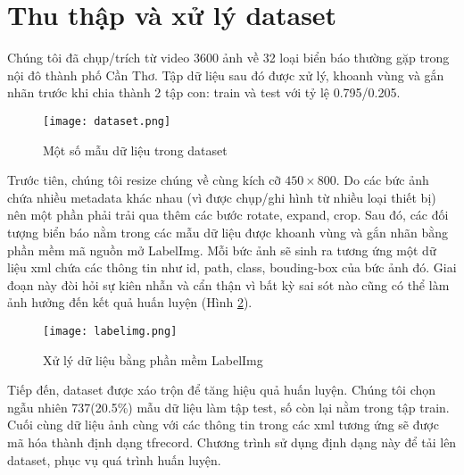 \documentclass[../thesis.tex]{subfiles}
\begin{document}
\section{Thu thập và xử lý dataset}

Chúng tôi đã chụp/trích từ video 3600 ảnh về 32 loại biển báo thường gặp trong nội đô thành phố Cần Thơ. Tập dữ liệu sau đó được xử lý, khoanh vùng và gắn nhãn trước khi chia thành 2 tập con: train và test với tỷ lệ 0.795/0.205.

\begin{figure}[!htb]
	\centering
	\texttt{[image: dataset.png]}
	\caption{Một số mẫu dữ liệu trong dataset}\label{Fig:dataset_records}
\end{figure}

Trước tiên, chúng tôi resize chúng về cùng kích cỡ $450 \times 800$. Do các bức ảnh chứa nhiều metadata khác nhau (vì được chụp/ghi hình từ nhiều loại thiết bị) nên một phần phải trải qua thêm các bước rotate, expand, crop. Sau đó, các đối tượng biển báo nằm trong các mẫu dữ liệu được khoanh vùng và gắn nhãn bằng phần mềm mã nguồn mở LabelImg\cite{labelimg}. Mỗi bức ảnh sẽ sinh ra tương ứng một dữ liệu xml chứa các thông tin như id, path, class, bouding-box của bức ảnh đó. Giai đoạn này đòi hỏi sự kiên nhẫn và cẩn thận vì bất kỳ sai sót nào cũng có thể làm ảnh hưởng đến kết quả huấn luyện (Hình \ref{Fig:labelimg}).

\begin{figure}[!htb]
	\centering
	\texttt{[image: labelimg.png]}
	\caption{Xử lý dữ liệu bằng phần mềm LabelImg}\label{Fig:labelimg}
\end{figure}

Tiếp đến, dataset được xáo trộn để tăng hiệu quả huấn luyện. Chúng tôi chọn ngẫu nhiên 737(20.5\%) mẫu dữ liệu làm tập test, số còn lại nằm trong tập train. Cuối cùng dữ liệu ảnh cùng với các thông tin trong các xml tương ứng sẽ được mã hóa thành định dạng tfrecord. Chương trình sử dụng định dạng này để tải lên dataset, phục vụ quá trình huấn luyện.
\end{document}
